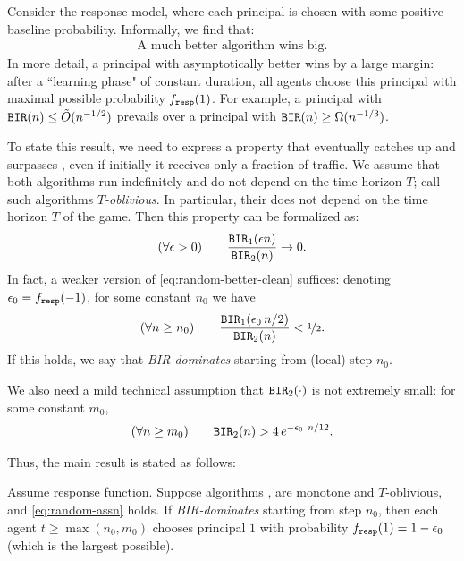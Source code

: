 Consider the \HardMaxRandom response model, where each principal is chosen with some positive baseline probability. Informally, we find that:
\begin{align}\label{eq:theory-HMR-informal}
\text{A much better algorithm wins big.}
\end{align}
In more detail, a principal with asymptotically better \BIR wins by a large margin: after a ``learning phase" of constant duration, all agents choose this principal with maximal possible probability $f_{\mathtt{resp}}(1)$. For example, a principal with $\mathtt{BIR}(n)\leq \tilde{O}(n^{-1/2})$ prevails over a principal with $\mathtt{BIR}(n)\geq \Omega(n^{-1/3})$.



To state this result, we need to express a property that \alg[1] eventually catches up and surpasses \alg[2], even if initially it receives only a fraction of traffic. We assume that both algorithms run indefinitely and do not depend on the time horizon $T$; call such algorithms \emph{$T$-oblivious}. In particular, their \BIR does not depend on the time horizon $T$ of the game.  Then this property can be formalized as:
\begin{align}\label{eq:random-better-clean}
(\forall \epsilon>0)\qquad
\frac{\mathtt{BIR}_1(\epsilon n)}{\mathtt{BIR}_2(n)} \to 0.
\end{align}
In fact, a weaker version of \eqref{eq:random-better-clean} suffices:
denoting $\epsilon_0 = f_{\mathtt{resp}}(-1)$, for some constant $n_0$ we have
\begin{align}\label{eq:random-better-weaker}
(\forall n\geq n_0) \qquad
\frac{\mathtt{BIR}_1(\epsilon_0\, n/2)}{\mathtt{BIR}_2(n)} <\nicefrac12.
\end{align}
If this holds, we say that \alg[1] \emph{BIR-dominates} \alg[2] starting from (local) step $n_0$.

We also need a mild technical assumption that $\mathtt{BIR}_2(\cdot)$ is not extremely small: for some constant $m_0$,
\begin{align}\label{eq:random-assn}
 (\forall n\geq m_0) \qquad
  \mathtt{BIR}_2(n) > 4\,e^{-\epsilon_0\ n/12}.
\end{align}

Thus, the main result is stated as follows:

\begin{theorem}\label{thm:random-clean}
Assume \HardMaxRandom response function. Suppose algorithms \alg[1], \alg[2] are monotone and $T$-oblivious, and \eqref{eq:random-assn} holds. If \alg[1] \emph{BIR-dominates} \alg[2] starting from step $n_0$, then each agent $t\geq \max(n_0,m_0)$ chooses principal $1$ with probability $f_{\mathtt{resp}}(1) = 1- \epsilon_0$ (which is the largest possible).
\end{theorem}




